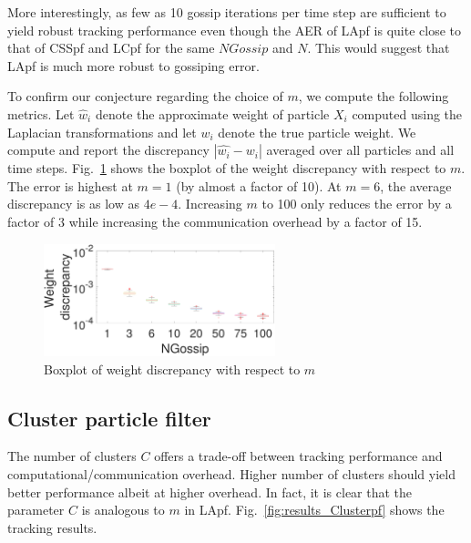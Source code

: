 \documentclass[10pt,letterpaper,final]{article}
\begin{document}
More interestingly, as few as 10 gossip iterations per time step are sufficient to yield robust tracking performance even though the AER of LApf is quite close to that of CSSpf and LCpf for the same $NGossip$ and $N$. This would suggest that LApf is much more robust to gossiping error. 


To confirm our conjecture regarding the choice of $m$, we compute the following metrics. Let $\hat{w}_i$ denote the approximate weight of particle $X_i$ computed using the Laplacian transformations and let $w_i$ denote the true particle weight. We compute and report the discrepancy $|\hat{w_i}-w_i|$ averaged over all particles and all time steps. Fig.~\ref{fig:boxplot_LApf_weight_discrepancy} shows the boxplot of the weight discrepancy with respect to $m$. The error is highest at $m=1$ (by almost a factor of 10). At $m=6$, the average discrepancy is as low as $4e-4$. Increasing $m$ to 100 only reduces the error by a factor of 3 while increasing the communication overhead by a factor of 15.  

\begin{figure}
\centering
\includegraphics[width=0.6\textwidth]{Figures/boxplot_LApf_weight_discrepancy}
\caption{Boxplot of weight discrepancy with respect to $m$}
\label{fig:boxplot_LApf_weight_discrepancy}
\end{figure}

\subsection{Cluster particle filter}
The number of clusters $C$ offers a trade-off between tracking performance and computational/communication overhead. Higher number of clusters should yield better performance albeit at higher overhead. In fact, it is clear that the parameter $C$ is analogous to $m$ in LApf. Fig.~\ref{fig:results_Clusterpf} shows the tracking results. 
\end{document}
